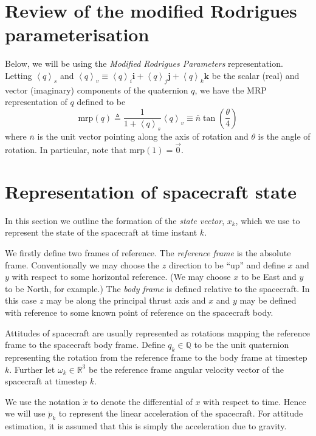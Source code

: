 \documentclass[a4paper]{paper}
\begin{document}
\section{Review of the modified Rodrigues parameterisation}

Below, we will be using the \emph{Modified Rodrigues Parameters} representation.
Letting $\left< q\right>_s$ and $\left< q\right>_v \equiv \left< q \right>_i
\mathbf{i} + \left< q\right>_j \mathbf{j} + \left< q\right>_k \mathbf{k}$ be the
scalar (real) and vector (imaginary) components of the quaternion $q$, we have
the MRP representation of $q$ defined to be
$$
\mbox{mrp}(q) \triangleq \frac{1}{1 + \left< q\right>_s} \left< q
\right>_v \equiv \bar{n} \tan \left( \frac{\theta}{4} \right)
$$
where $\bar{n}$ is the unit vector pointing along the axis of rotation and
$\theta$ is the angle of rotation. In particular, note that $\mbox{mrp}(1) =
\vec{0}$.

\section{Representation of spacecraft state}

In this section we outline the formation of the \emph{state vector}, $x_k$,
which we use to represent the state of the spacecraft at time instant $k$.

We firstly define two frames of reference. The \emph{reference frame} is the
absolute frame. Conventionally we may choose the $z$ direction to be ``up'' and
define $x$ and $y$ with respect to some horizontal reference. (We may choose $x$
to be East and $y$ to be North, for example.) The \emph{body frame} is defined
relative to the spacecraft. In this case $z$ may be along the principal thrust
axis and $x$ and $y$ may be defined with reference to some known point of
reference on the spacecraft body.

Attitudes of spacecraft are usually represented as rotations mapping the
reference frame to the spacecraft body frame. Define $q_k \in \mathbb{Q}$ to be
the unit quaternion representing the rotation from the reference frame to the
body frame at timestep $k$. Further let $\omega_k \in \mathbb{R}^3$ be the
reference frame angular velocity vector of the spacecraft at timestep $k$.

We use the notation $\dot{x}$ to denote the differential of $x$ with respect to
time. Hence we will use $\ddot{p}_k$ to represent the linear acceleration of the
spacecraft. For attitude estimation, it is assumed that this is simply the
acceleration due to gravity.
\end{document}
